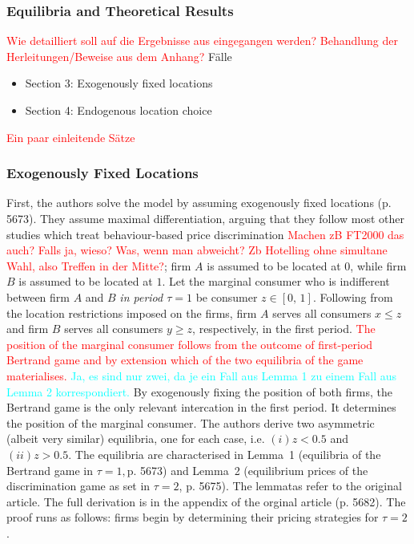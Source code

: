 \documentclass[a4paper, 11 pt, fleqn]{article}
\begin{document}
\subsubsection{Equilibria and Theoretical Results} \label{ssec:choe-results}
\textcolor{red}{Wie detailliert soll auf die Ergebnisse aus \citet{Choe.2018} eingegangen werden? Behandlung der Herleitungen/Beweise aus dem Anhang?}
Fälle
\begin{itemize}
	\item Section 3: Exogenously fixed locations
	\item Section 4: Endogenous location choice
\end{itemize}
\textcolor{red}{Ein paar einleitende Sätze} \\
\subsubsection*{Exogenously Fixed Locations}
First, the authors solve the model by assuming exogenously fixed locations (p. 5673). They assume maximal differentiation, arguing that they
follow most other studies which treat behaviour-based price discrimination \textcolor{red}{Machen zB FT2000 das auch? Falls ja, wieso? Was, wenn man abweicht? Zb Hotelling ohne simultane Wahl, also Treffen in der Mitte?};
firm $A$ is assumed to be located at $0$, while firm $B$ is assumed to be located at $1$. Let the marginal consumer who is indifferent between
firm $A$ and $B$ \textit{in period $\tau = 1$} be consumer $z \in [0,\,1]$. Following from the location restrictions imposed on the firms, firm $A$ serves all
consumers $x \leq z$ and firm $B$ serves all consumers $y \geq z$, respectively, in the first period. \textcolor{red}{The position of the marginal
consumer follows from the outcome of first-period Bertrand game and by extension which of the two equilibria of the game materialises.}
\textcolor{cyan}{Ja, es sind nur zwei, da je ein Fall aus Lemma 1 zu einem Fall aus Lemma 2 korrespondiert.}
By exogenously fixing the position of both firms, the Bertrand game is the only relevant intercation in the first period.
It determines the position of the marginal consumer. The authors derive two asymmetric (albeit very similar) equilibria, one for each case, i.e. $(i) z < 0.5$
and $(ii) z > 0.5$. The equilibria are characterised in Lemma~1 (equilibria of the Bertrand game in $\tau = 1, $p. 5673) and Lemma~2
(equilibrium prices of the discrimination game as set in $\tau = 2$, p. 5675). The lemmatas refer to the original article. The full derivation
is in the appendix of the orginal article (p. 5682). The proof runs as follows: firms begin by determining their pricing strategies for $\tau = 2$.
\end{document}
